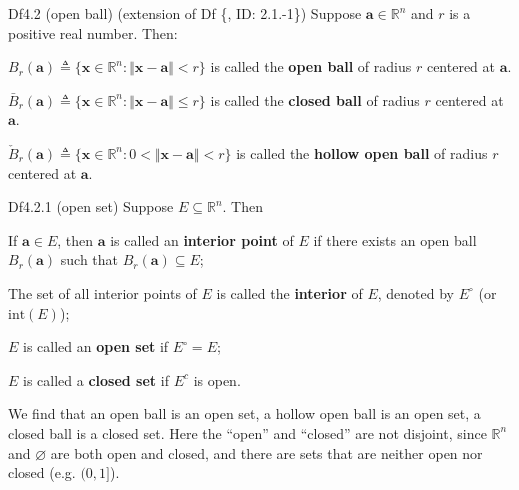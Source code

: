 \documentclass{article}
\begin{document}
\begin{Df}{Df4.2 (open ball) (extension of Df \{, ID: 2.1.-1\})}
    Suppose $\pmb{a}\in\mathbb{R}^n$ and $r$ is a positive real number. Then:
    \begin{compactenum}
        \item $B_r(\pmb{a})\triangleq \{\pmb{x}\in\mathbb{R}^n: \Vert \pmb{x}-\pmb{a}\Vert < r\}$ is called the \textbf{open ball} of radius $r$ centered at $\pmb{a}$.
        \item $\bar{B}_r(\pmb{a})\triangleq \{\pmb{x}\in\mathbb{R}^n: \Vert \pmb{x}-\pmb{a}\Vert \leq r\}$ is called the \textbf{closed ball} of radius $r$ centered at $\pmb{a}$.
        \item $\check{B}_r(\pmb{a})\triangleq \{\pmb{x}\in\mathbb{R}^n: 0 < \Vert \pmb{x}-\pmb{a}\Vert < r\}$ is called the \textbf{hollow open ball} of radius $r$ centered at $\pmb{a}$.
    \end{compactenum}
\end{Df}

\begin{Df}{Df4.2.1 (open set)}
    Suppose $E\subseteq\mathbb{R}^n$. Then 
    \begin{compactenum}
        \item If $\pmb{a}\in E$, then $\pmb{a}$ is called an \textbf{interior point} of $E$ if there exists an open ball $B_r(\pmb{a})$ such that $B_r(\pmb{a})\subseteq E$;
        \item The set of all interior points of $E$ is called the \textbf{interior} of $E$, denoted by $E^\circ$ (or $\text{int}(E)$);
        \item $E$ is called an \textbf{open set} if $E^\circ = E$;
        \item $E$ is called a \textbf{closed set} if $E^c$ is open.
    \end{compactenum}
\end{Df}

\begin{Rmk}{}
    We find that \textcolor{Th}{an open ball is an open set, a hollow open ball is an open set, a closed ball is a closed set}. Here the ``open'' and ``closed'' are not disjoint, since \textcolor{Th}{$\mathbb{R}^n$ and $\varnothing$ are both open and closed}, and \textcolor{Th}{there are sets that are neither open nor closed (e.g. $(0,1]$).}
\end{Rmk}
\end{document}
